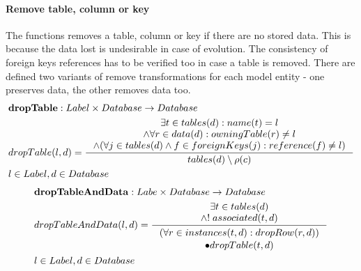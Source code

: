 \documentclass[11pt]{article}
\begin{document}
\paragraph{Remove table, column or key} The functions removes a table, column or key if there are no stored data. This is because the data lost is undesirable in case of evolution. The consistency of foreign keys references has to be verified too in case a table is removed.  There are defined two variants of remove transformations for each model entity - one preserves data, the other removes data too.
\begin{align*}
&	\mathbf{dropTable} : Label \times Database \rightarrow Database \\
&	dropTable(l,d) = \inference{ \exists t \in tables(d) : name(t) = l  \\ \wedge \forall r \in data(d) : owningTable(r) \neq l \\  \wedge (\forall j \in tables(d) \wedge f \in foreignKeys(j) : reference(f) \neq l) }{ tables(d) \setminus \rho(c)}\\
& l \in Label, d \in Database
\end{align*}
\begin{align*}
&	\mathbf{dropTableAndData} : Labe \times Database \rightarrow Database \\
&	dropTableAndData(l, d) = \inference{\exists t \in tables(d) \\ \wedge ! \; associated(t, d)}{\begin{gathered}
	(\forall r \in instances(t,d) : dropRow(r, d))\\ \bullet dropTable(t,d)
\end{gathered}}
	\\& l \in Label, d \in Database
\end{align*}
\end{document}
